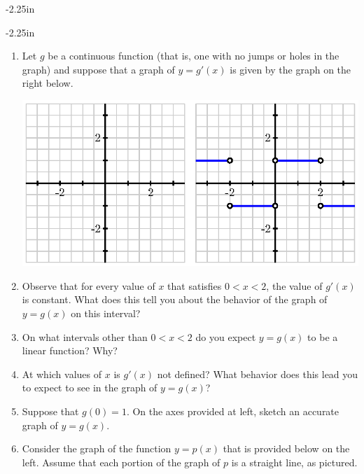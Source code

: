 \begin{adjustwidth*}{}{-2.25in}
\begin{multicols*}{2}
\end{multicols*}
\end{adjustwidth*}

\clearpage

\begin{adjustwidth*}{}{-2.25in}
\setlength{\columnsep}{25pt}
\begin{multicols*}{2}\small

\begin{enumerate}[1),start=11]
\item Let $g$ be a continuous function (that is, one with no jumps or holes in the graph) and suppose that a graph of $y= g'(x)$ is given by the graph on the right below.

\includegraphics[scale=.75]{figures/1_4_Ez2.eps} %

\ba
\item Observe that for every value of $x$ that satisfies $0 < x < 2$, the value of $g'(x)$ is constant.  What does this tell you about the behavior of the graph of $y = g(x)$ on this interval?
\item On what intervals other than $0 < x < 2$ do you expect $y = g(x)$ to be a linear function?  Why?
\item At which values of $x$ is $g'(x)$ not defined?  What behavior does this lead you to expect to see in the graph of $y=g(x)$?
\item Suppose that $g(0) = 1$.  On the axes provided at left, sketch an accurate graph of $y = g(x)$.
\ea

\item Consider the graph of the function $y = p(x)$ that is provided below on the left.  Assume that each portion of the graph of $p$ is a straight line, as pictured.


\end{enumerate}
\end{multicols*}
\end{adjustwidth*}
